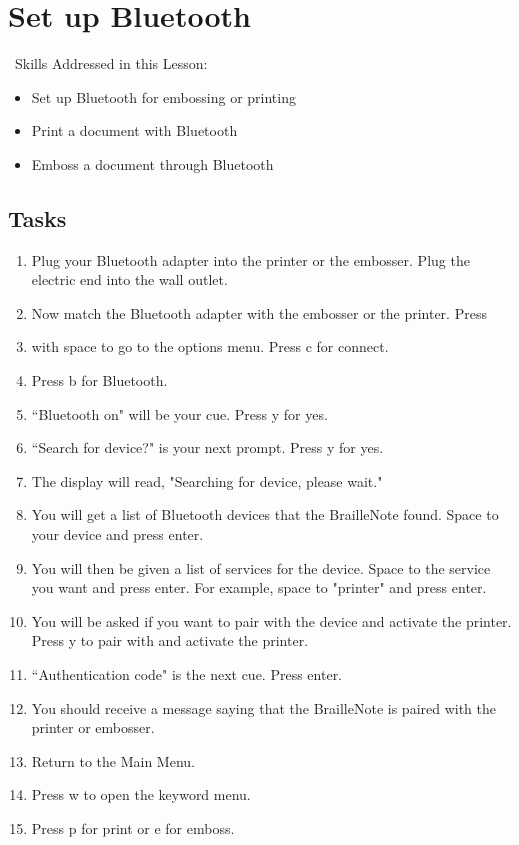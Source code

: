 \documentclass[10pt,letterpaper,twoside]{report}
\begin{document}
{{{\section{ Set up Bluetooth}
\
Skills Addressed in this Lesson:
\begin{itemize}
	\item Set up Bluetooth for embossing or printing
	\item Print a document with Bluetooth
	\item Emboss a document through Bluetooth
\end{itemize}

\subsection{Tasks}
\begin{enumerate}
	\item Plug your Bluetooth adapter into the printer or the embosser.  Plug the electric end into the wall outlet.
	\item Now match the Bluetooth adapter with the embosser or the printer.  Press
	\item with space to go to the options menu.  Press c for connect.
	\item Press b for Bluetooth.
	\item ``Bluetooth on" will be your cue.  Press y for yes.
	\item ``Search for device?" is your next prompt.  Press y for yes.
	\item The display will read, "Searching for device, please wait."
	\item You will get a list of Bluetooth devices that the BrailleNote found. Space to your device and press enter.
	\item You will then be given a list of services for the device.  Space to the service you want and press enter.  For example, space to "printer" and press enter.
	\item You will be asked if you want to pair with the device and activate the printer.  Press y to pair with and activate the printer.
	\item ``Authentication code" is the next cue.  Press enter.
	\item You should receive a message saying that the BrailleNote is paired with the printer or embosser.
	\item Return to the Main Menu.
	\item Press w to open the keyword menu.
	\item Press p for print or e for emboss.

\end{enumerate}}}}
\end{document}
